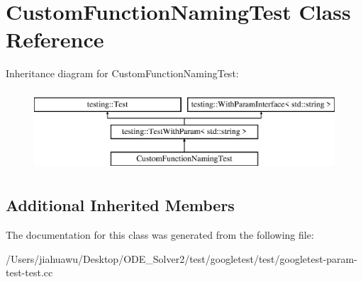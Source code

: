 \hypertarget{class_custom_function_naming_test}{}\section{Custom\+Function\+Naming\+Test Class Reference}
\label{class_custom_function_naming_test}
Inheritance diagram for Custom\+Function\+Naming\+Test\+:\begin{figure}[H]
\begin{center}
\leavevmode
\includegraphics[height=3.000000cm]{class_custom_function_naming_test}
\end{center}
\end{figure}
\subsection*{Additional Inherited Members}


The documentation for this class was generated from the following file\+:\begin{DoxyCompactItemize}
\item 
/\+Users/jiahuawu/\+Desktop/\+O\+D\+E\+\_\+\+Solver2/test/googletest/test/googletest-\/param-\/test-\/test.\+cc\end{DoxyCompactItemize}
